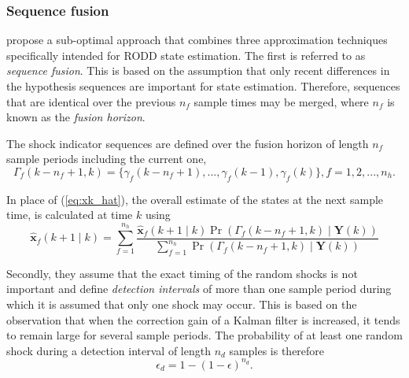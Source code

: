 \subsubsection{Sequence fusion} \label{subsec-fusion}

\cite{robertson_detection_1995} propose a sub-optimal approach that combines three approximation techniques specifically intended for RODD state estimation. The first is referred to as \textit{sequence fusion}. This is based on the assumption that only recent differences in the hypothesis sequences are important for state estimation. Therefore, sequences that are identical over the previous $n_f$ sample times may be merged, where $n_f$ is known as the \textit{fusion horizon}.

The shock indicator sequences are defined over the fusion horizon of length $n_f$ sample periods including the current one,
\begin{equation} \label{eq:Gamma_kmf_k}
	\Gamma_f(k-n_f+1,k)=\{\gamma_f(k-n_f+1), ...,  \gamma_f(k-1), \gamma_f(k)\}, f=1,2,...,n_h.
\end{equation}



In place of (\ref{eq:xk_hat}), the overall estimate of the states at the next sample time, is calculated at time $k$ using
\begin{equation} \label{eq:x_f_hat_SF}
	\mathbf{\hat{x}}_f(k+1 \mid k) = \sum_{f=1}^{n_h} \frac{\mathbf{\hat{x}}_f(k+1 \mid k) \Pr(\Gamma_f(k-n_f+1,k) \mid \mathbf{Y}(k))}{\sum_{f=1}^{n_h} \Pr(\Gamma_f(k-n_f+1,k) \mid \mathbf{Y}(k))}
\end{equation}

Secondly, they assume that the exact timing of the random shocks is not important and define \textit{detection intervals} of more than one sample period during which it is assumed that only one shock may occur. This is based on the observation that when the correction gain of a Kalman filter is increased, it tends to remain large for several sample periods. The probability of at least one random shock during a detection interval of length $n_d$ samples is therefore
\begin{equation} \label{eq:p_gamma_d}
	\epsilon_d = 1 - (1 - \epsilon)^{n_d}.
\end{equation}

